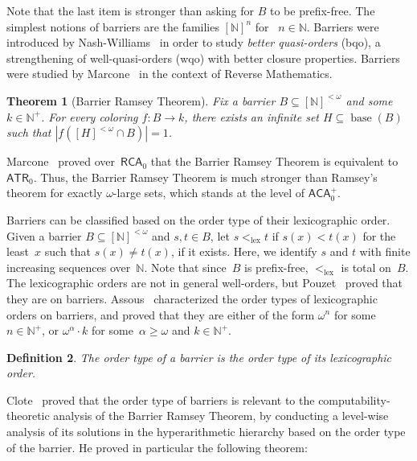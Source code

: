 \documentclass[10pt,a4paper]{article}
\newcommand{\RCA}[0]{\mathsf{RCA}}
\newcommand{\ACA}[0]{\mathsf{ACA}}
\newcommand{\ATR}[0]{\mathsf{ATR}}
\newcommand{\NN}[0]{\mathbb{N}}
\newcommand{\lex}{\mathrm{lex}}
\newcommand{\base}{\operatorname{base}}
\newtheorem{theorem}{Theorem}
\numberwithin{theorem}{section}
\newtheorem{definition}[theorem]{Definition}
\begin{document}
Note that the last item is stronger than asking for $B$ to be prefix-free.
The simplest notions of barriers are the families $[\NN]^n$ for ~$n \in \NN$. %
Barriers were introduced by Nash-Williams~\cite{nash-williams1968better} in order to study \emph{better quasi-orders} (bqo), a strengthening of well-quasi-orders (wqo) with better closure properties. Barriers were studied by Marcone~\cite{marcone2005wqo} in the context of Reverse Mathematics.

\begin{theorem}[Barrier Ramsey Theorem]\label{thm:bart}
Fix a barrier $B \subseteq [\NN]^{<\omega}$ and some~$k \in \NN^+$. 
For every coloring $f : B \to k$, there exists an infinite set $H \subseteq \base(B)$ such that $|f([H]^{<\omega} \cap B)| = 1$. 
\end{theorem}

Marcone~\cite{marcone2005wqo} proved over~$\RCA_0$ that the Barrier Ramsey Theorem is equivalent to~$\ATR_0$. Thus, the Barrier Ramsey Theorem is much stronger than Ramsey's theorem for exactly $\omega$-large sets, which stands at the level of $\ACA_0^+$.

Barriers can be classified based on the order type of their lexicographic order. Given a barrier $B \subseteq [\NN]^{<\omega}$ and $s, t \in B$, let $s <_\lex t$ if $s(x) < t(x)$ for the least~$x$ such that $s(x) \neq t(x)$, if it exists. Here, we identify $s$ and $t$ with finite increasing sequences over~$\NN$. Note that since~$B$ is prefix-free, $<_\lex$ is total on~$B$.
The lexicographic orders are not in general well-orders, but Pouzet~\cite{pouzet1972premeilleurordres} proved that they are on barriers. Assous~\cite{assous1974caracterisation} characterized the order types of lexicographic orders on barriers, and proved that they are either of the form $\omega^n$ for some~$n \in \NN^+$, or $\omega^\alpha \cdot k$ for some~$\alpha \geq \omega$ and $k \in \NN^+$. %

\begin{definition}
The order type of a barrier is the order type of its lexicographic order.
\end{definition}

Clote~\cite{clote1984recursion} proved that the order type of barriers is relevant to the computability-theoretic analysis of the Barrier Ramsey Theorem, by conducting a level-wise analysis of its solutions in the hyperarithmetic hierarchy based on the order type of the barrier. He proved in particular the following theorem:
\end{document}

